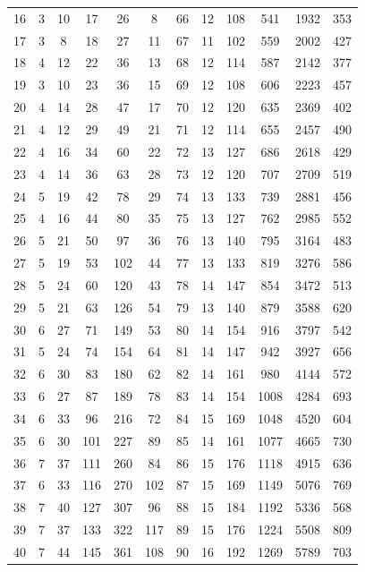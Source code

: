 \documentclass[11pt,a4paper]{book}
\begin{document}
\begin{center}
\begin{tabular}{|c|c|c|c|c|c||c|c|c|c|c|c|}
16 & 3 & 10 & 17 & 26 & 8 & 66 & 12 & 108 & 541 & 1932 & 353 \\
17 & 3 & 8 & 18 & 27 & 11 & 67 & 11 & 102 & 559 & 2002 & 427 \\
18 & 4 & 12 & 22 & 36 & 13 & 68 & 12 & 114 & 587 & 2142 & 377 \\
19 & 3 & 10 & 23 & 36 & 15 & 69 & 12 & 108 & 606 & 2223 & 457 \\
20 & 4 & 14 & 28 & 47 & 17 & 70 & 12 & 120 & 635 & 2369 & 402 \\
21 & 4 & 12 & 29 & 49 & 21 & 71 & 12 & 114 & 655 & 2457 & 490 \\
22 & 4 & 16 & 34 & 60 & 22 & 72 & 13 & 127 & 686 & 2618 & 429 \\
23 & 4 & 14 & 36 & 63 & 28 & 73 & 12 & 120 & 707 & 2709 & 519 \\
24 & 5 & 19 & 42 & 78 & 29 & 74 & 13 & 133 & 739 & 2881 & 456 \\
25 & 4 & 16 & 44 & 80 & 35 & 75 & 13 & 127 & 762 & 2985 & 552 \\
26 & 5 & 21 & 50 & 97 & 36 & 76 & 13 & 140 & 795 & 3164 & 483 \\
27 & 5 & 19 & 53 & 102 & 44 & 77 & 13 & 133 & 819 & 3276 & 586 \\
28 & 5 & 24 & 60 & 120 & 43 & 78 & 14 & 147 & 854 & 3472 & 513 \\
29 & 5 & 21 & 63 & 126 & 54 & 79 & 13 & 140 & 879 & 3588 & 620 \\
30 & 6 & 27 & 71 & 149 & 53 & 80 & 14 & 154 & 916 & 3797 & 542 \\
31 & 5 & 24 & 74 & 154 & 64 & 81 & 14 & 147 & 942 & 3927 & 656 \\
32 & 6 & 30 & 83 & 180 & 62 & 82 & 14 & 161 & 980 & 4144 & 572 \\
33 & 6 & 27 & 87 & 189 & 78 & 83 & 14 & 154 & 1008 & 4284 & 693 \\
34 & 6 & 33 & 96 & 216 & 72 & 84 & 15 & 169 & 1048 & 4520 & 604 \\
35 & 6 & 30 & 101 & 227 & 89 & 85 & 14 & 161 & 1077 & 4665 & 730 \\
36 & 7 & 37 & 111 & 260 & 84 & 86 & 15 & 176 & 1118 & 4915 & 636 \\
37 & 6 & 33 & 116 & 270 & 102 & 87 & 15 & 169 & 1149 & 5076 & 769 \\
38 & 7 & 40 & 127 & 307 & 96 & 88 & 15 & 184 & 1192 & 5336 & 568 \\
39 & 7 & 37 & 133 & 322 & 117 & 89 & 15 & 176 & 1224 & 5508 & 809 \\
40 & 7 & 44 & 145 & 361 & 108 & 90 & 16 & 192 & 1269 & 5789 & 703 \\

\end{tabular}
\end{center}
\end{document}

